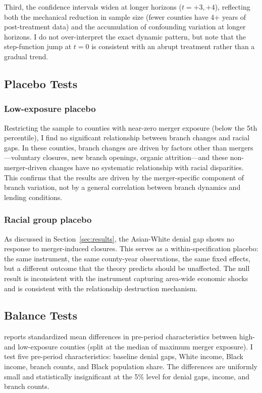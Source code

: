 \documentclass[12pt]{article}
\begin{document}
Third, the confidence intervals widen at longer horizons ($t = +3, +4$), reflecting both the mechanical reduction in sample size (fewer counties have 4+ years of post-treatment data) and the accumulation of confounding variation at longer horizons. I do not over-interpret the exact dynamic pattern, but note that the step-function jump at $t = 0$ is consistent with an abrupt treatment rather than a gradual trend.

\subsection{Placebo Tests}

\subsubsection*{Low-exposure placebo} Restricting the sample to counties with near-zero merger exposure (below the 5th percentile), I find no significant relationship between branch changes and racial gaps. In these counties, branch changes are driven by factors other than mergers---voluntary closures, new branch openings, organic attrition---and these non-merger-driven changes have no systematic relationship with racial disparities. This confirms that the results are driven by the merger-specific component of branch variation, not by a general correlation between branch dynamics and lending conditions.

\subsubsection*{Racial group placebo} As discussed in Section~\ref{sec:results}, the Asian-White denial gap shows no response to merger-induced closures. This serves as a within-specification placebo: the same instrument, the same county-year observations, the same fixed effects, but a different outcome that the theory predicts should be unaffected. The null result is inconsistent with the instrument capturing area-wide economic shocks and is consistent with the relationship destruction mechanism.

\subsection{Balance Tests}

 reports standardized mean differences in pre-period characteristics between high- and low-exposure counties (split at the median of maximum merger exposure). I test five pre-period characteristics: baseline denial gaps, White income, Black income, branch counts, and Black population share. The differences are uniformly small and statistically insignificant at the 5\% level for denial gaps, income, and branch counts.
\end{document}
